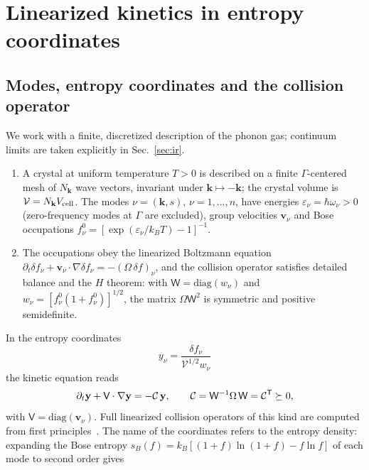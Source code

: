 \section{Linearized kinetics in entropy coordinates}\label{sec:kinetics}

\subsection{Modes, entropy coordinates and the collision operator}\label{sec:modes}

We work with a finite, discretized description of the phonon gas; continuum limits are taken explicitly
in Sec.~\ref{sec:ir}.
\begin{enumerate}
\item[(K1)] A crystal at uniform temperature $T>0$ is described on a finite $\Gamma$-centered mesh of
$N_{\mathbf k}$ wave vectors, invariant under $\mathbf k\mapsto-\mathbf k$; the crystal volume is
$\mathcal V=N_{\mathbf k}V_{\rm cell}$. The modes $\nu=(\mathbf k,s)$, $\nu=1,\dots,n$, have energies
$\varepsilon_\nu=\hbar\omega_\nu>0$ (zero-frequency modes at $\Gamma$ are excluded), group velocities
$\mathbf v_\nu$ and Bose occupations $f^0_\nu=[\exp(\varepsilon_\nu/k_BT)-1]^{-1}$.
\item[(K2)] The occupations obey the linearized Boltzmann equation
$\partial_t\delta f_\nu+\mathbf v_\nu\cdot\nabla\delta f_\nu=-(\Omega\,\delta f)_\nu$, and the collision
operator satisfies detailed balance and the $H$ theorem: with $\mathsf W=\mathrm{diag}(w_\nu)$ and
$w_\nu=[f^0_\nu(1+f^0_\nu)]^{1/2}$, the matrix $\Omega\mathsf W^2$ is symmetric and positive semidefinite.
\end{enumerate}
In the entropy coordinates
\begin{equation}
y_\nu=\frac{\delta f_\nu}{\mathcal V^{1/2}w_\nu}
\label{eq:entropycoords}
\end{equation}
the kinetic equation reads
\begin{equation}
\partial_t\mathbf y+\mathsf V\cdot\nabla\mathbf y=-\mathcal C\,\mathbf y,\qquad \mathcal C=\mathsf W^{-1}\Omega\,\mathsf W=\mathcal C^{\mathsf T}\succeq0,
\label{eq:kinetic}
\end{equation}
with $\mathsf V=\mathrm{diag}(\mathbf v_\nu)$. Full linearized collision operators of this kind are
computed from first principles~\cite{Chaput2013,Fugallo2013,CepellottiMarzari2016}. The name of the
coordinates refers to the entropy density: expanding the
Bose entropy $s_B(f)=k_B[(1+f)\ln(1+f)-f\ln f]$ of each mode to second order gives
